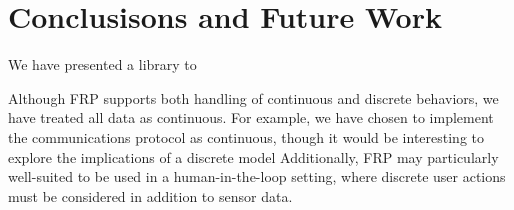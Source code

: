 \section{Conclusisons and Future Work}

We have presented a library to 

Although FRP supports both handling of continuous and discrete behaviors, we have treated all data as continuous.
For example, we have chosen to implement the communications protocol as continuous, though it would be interesting to explore the implications of a discrete model
Additionally, FRP may particularly well-suited to be used in a human-in-the-loop setting, where discrete user actions must be considered in addition to sensor data.

